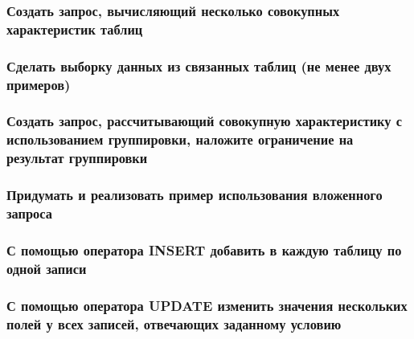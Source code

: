 

\subsubsection{Создать запрос, вычисляющий несколько совокупных характеристик таблиц}



\subsubsection{Сделать выборку данных из связанных таблиц (не менее двух примеров)}



\subsubsection{Создать запрос, рассчитывающий совокупную характеристику с использованием группировки, наложите ограничение на результат группировки}



\subsubsection{Придумать и реализовать пример использования вложенного запроса}



\subsubsection{С помощью оператора INSERT добавить в каждую таблицу по одной записи}



\subsubsection{С помощью оператора UPDATE изменить значения нескольких полей у всех записей, отвечающих заданному условию}



